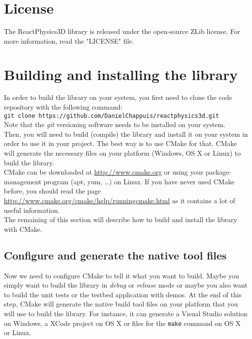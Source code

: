 \documentclass[a4paper,12pt]{article}
\begin{document}
    \section{License}

    The ReactPhysics3D library is released under the open-source ZLib license. For more information, read the "LICENSE" file.

    \section{Building and installing the library}
    \label{sec:building}

    In order to build the library on your system, you first need to clone the code repository with the following command: \\

    \texttt{git clone https://github.com/DanielChappuis/reactphysics3d.git} \\

    Note that the \emph{git} versioning software needs to be installed on your system. \\

    Then, you will need to build (compile) the library and install it on your system in order to use it in your project.
    The best way is to use CMake for that. CMake will generate the necessary files on your platform (Windows, OS X or Linux) to build
    the library. \\

    CMake can be downloaded at \url{http://www.cmake.org} or using your package-management program (apt, yum, \dots) on Linux.
    If you have never used CMake before, you should read the page \url{http://www.cmake.org/cmake/help/runningcmake.html} as
    it contains a lot of useful information. \\

    The remaining of this section will describe how to build and install the library with CMake. \\

    \subsection{Configure and generate the native tool files}

    Now we need to configure CMake to tell it what you want to build. Maybe you simply want to build the library in \emph{debug} or \emph{release}
    mode or maybe you also want to build the unit tests or the testbed application with demos. At the end of this step, CMake will generate the
    native build tool files on your platform that you will use to build the library. For instance, it can generate a Visual Studio solution on Windows,
    a XCode project on OS X or files for the \texttt{make} command on OS X or Linux.
\end{document}
